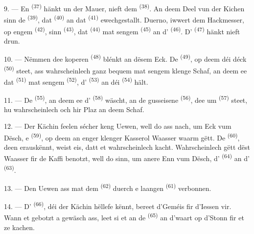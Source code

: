 9. --- En  \textsuperscript{(37)} hänkt un der Mauer, nieft dem
 \textsuperscript{(38)}. An deem Deel vun der Kichen sinn de
 \textsuperscript{(39)}, dat  \textsuperscript{(40)}
an dat  \textsuperscript{(41)} ewechgestallt. Duerno, iwwert dem
Hackmesser, op engem  \textsuperscript{(42)}, sinn 
\textsuperscript{(43)}, dat  \textsuperscript{(44)} mat sengem
 \textsuperscript{(45)} an d' \textsuperscript{(46)}.
D' \textsuperscript{(47)} hänkt nieft drun.

10. --- Nëmmen dee koperen  \textsuperscript{(48)} blénkt an
dësem Eck. De  \textsuperscript{(49)}, op deem déi déck
 \textsuperscript{(50)} steet, ass wahrscheinlech ganz bequem mat sengem
klenge Schaf, an deem ee dat  \textsuperscript{(51)} mat sengem
 \textsuperscript{(52)}, d' \textsuperscript{(53)}
an déi  \textsuperscript{(54)} hält.

\VUsaut{4.0mm}
\VUsaut{3.0mm}

11. --- De  \textsuperscript{(55)}, an deem ee d'
\textsuperscript{(58)} wäscht, an de gusseisene 
\textsuperscript{(56)}, dee um  \textsuperscript{(57)} steet, hu
wahrscheinlech och hir Plaz an deem Schaf.

12. --- Der Kächin feelen sécher keng Uewen, well do ass nach, um Eck vum Dësch, e
 \textsuperscript{(59)}, op deem an enger klenger Kasserol Waasser
waarm gëtt. De  \textsuperscript{(60)}, deen erauskënnt, weist eis, datt
et wahrscheinlech kacht. Wahrscheinlech gëtt dëst Waasser fir de Kaffi benotzt, well
do sinn, um anere Enn vum Dësch, d' \textsuperscript{(64)} an
d' \textsuperscript{(63)}.

13. --- Den Uewen ass mat dem  \textsuperscript{(62)} duerch e
laangen  \textsuperscript{(61)} verbonnen.

14. --- D' \textsuperscript{(66)}, déi der Kächin hëllefe
kënnt, bereet d'Geméis fir d'Iessen vir. Wann et gebotzt a gewäsch ass, leet si et an
de  \textsuperscript{(65)} an d'waart op d'Stonn fir et ze kachen.

